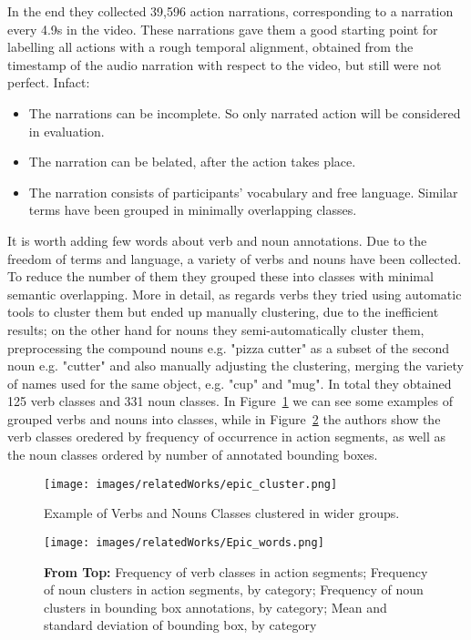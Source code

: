 In the end they collected 39,596 action narrations, corresponding to a narration
every 4.9s in the video. These narrations gave them a good starting point for labelling
all actions with a rough temporal alignment, obtained from the timestamp of the audio narration
with respect to the video, but still were not perfect. Infact:
\begin{itemize}
    \item The narrations can be incomplete. So only narrated action will be considered in evaluation.
    \item The narration can be belated, after the action takes place.
    \item The narration consists of participants' vocabulary and free language. Similar terms
    have been grouped in minimally overlapping classes.
\end{itemize}
It is worth adding few words about verb and noun annotations. Due to the freedom of 
terms and language, a variety of verbs and nouns have been collected. To reduce the number
of them they grouped these into classes with minimal semantic overlapping. More in detail,
as regards verbs they tried using automatic tools to cluster them but ended up manually
clustering, due to the inefficient results; on the other hand for nouns they semi-automatically
cluster them, preprocessing the compound nouns e.g. "pizza cutter" as a subset  of the second 
noun e.g. "cutter" and also manually adjusting the clustering, merging the variety of 
names used for the same object, e.g. "cup" and "mug". In total they obtained 125 verb classes and
331 noun classes. In Figure~\ref{fig:epic_table} we can see some examples of grouped verbs and
nouns into classes, while in Figure~\ref{fig:epic_freq} the authors show the verb classes
oredered by frequency of occurrence in action segments, as well as the noun classes
ordered by number of annotated bounding boxes.

\begin{figure}[t]
    \centering
    \texttt{[image: images/relatedWorks/epic\_cluster.png]} %
    \caption{Example of Verbs and Nouns Classes clustered in wider groups.}\label{fig:epic_table}
\end{figure}
\begin{figure}[t]
    \centering
    \texttt{[image: images/relatedWorks/Epic\_words.png]} %
    \caption{\textbf{From Top:} Frequency of verb classes in action segments;
        Frequency of noun clusters in action segments, by category; Frequency of noun
        clusters in bounding box annotations, by category; Mean and standard deviation of
        bounding box, by category}\label{fig:epic_freq}
\end{figure}

